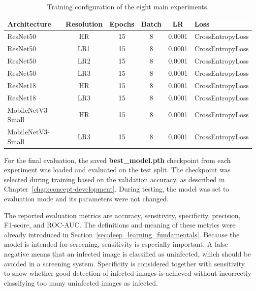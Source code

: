 \begin{table}[htbp]
    \centering
    \caption{Training configuration of the eight main experiments.}
    \label{tab:experimental_setup}

    \small
    \setlength{\tabcolsep}{4pt}

    \begin{tabular}{|l|c|c|c|c|l|}
        \hline
        \textbf{Architecture} & \textbf{Resolution} & \textbf{Epochs} &
        \textbf{Batch} & \textbf{LR} & \textbf{Loss} \\ \hline

        ResNet50 & HR  & 15 & 8 & 0.0001 & CrossEntropyLoss \\ \hline
        ResNet50 & LR1 & 15 & 8 & 0.0001 & CrossEntropyLoss \\ \hline
        ResNet50 & LR2 & 15 & 8 & 0.0001 & CrossEntropyLoss \\ \hline
        ResNet50 & LR3 & 15 & 8 & 0.0001 & CrossEntropyLoss \\ \hline

        ResNet18 & HR  & 15 & 8 & 0.0001 & CrossEntropyLoss \\ \hline
        ResNet18 & LR3 & 15 & 8 & 0.0001 & CrossEntropyLoss \\ \hline

        MobileNetV3-Small & HR  & 15 & 8 & 0.0001 & CrossEntropyLoss \\ \hline
        MobileNetV3-Small & LR3 & 15 & 8 & 0.0001 &
        CrossEntropyLoss \\ \hline
    \end{tabular}
\end{table}

\FloatBarrier

For the final evaluation, the saved \textbf{best\_model.pth} checkpoint from each experiment was loaded and evaluated on the test split. The checkpoint was selected during training based on the validation accuracy, as described in Chapter~\ref{chap:concept-development}. During testing, the model was set to evaluation mode and its parameters were not changed.

The reported evaluation metrics are accuracy, sensitivity, specificity, precision, F1-score, and ROC-AUC. The definitions and meaning of these metrics were already introduced in Section~\ref{sec:deep_learning_fundamentals}. Because the model is intended for screening, sensitivity is especially important. A false negative means that an infected image is classified as uninfected, which should be avoided in a screening system. Specificity is considered together with sensitivity to show whether good detection of infected images is achieved without incorrectly classifying too many uninfected images as infected.

